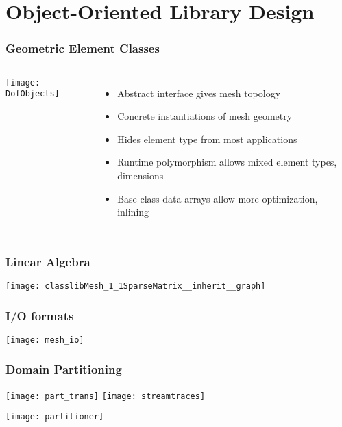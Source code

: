 \section{Object-Oriented Library Design}


\begin{frame}
\frametitle{Geometric Element Classes}

\begin{columns}
\begin{center}
\vspace{-5mm}
\texttt{[image: DofObjects]}
\end{center}
\begin{itemize}
\item Abstract interface gives mesh topology
\item Concrete instantiations of mesh geometry
\item Hides element type from most applications
\item Runtime polymorphism allows mixed element types, dimensions
\item Base class data arrays allow more optimization, inlining
\end{itemize}

\end{columns}

\end{frame}


\frame
{
  \frametitle{Linear Algebra}
  \begin{center}
    \texttt{[image: classlibMesh\_1\_1SparseMatrix\_\_inherit\_\_graph]}
  \end{center}
}



\frame
{
  \frametitle{I/O formats}
  \begin{center}
    \texttt{[image: mesh\_io]}
  \end{center}
}


\frame
{
  \frametitle{Domain Partitioning}
  \begin{center}
    \texttt{[image: part\_trans]}
    \texttt{[image: streamtraces]}
  \end{center}  

  \texttt{[image: partitioner]}
}


